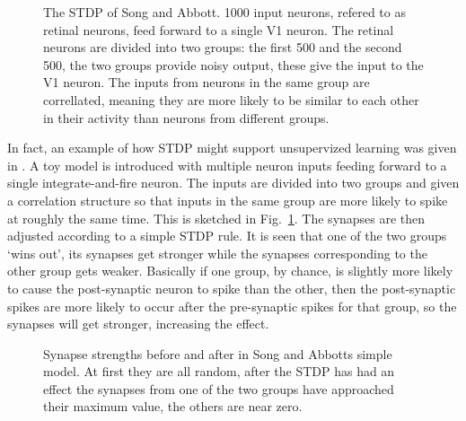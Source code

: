 \documentclass[11pt,a4paper]{scrartcl}
\begin{document}
\begin{figure}
\begin{center}
\end{center}
\caption{The STDP of Song and Abbott. 1000 input neurons, refered to
  as retinal neurons, feed forward to a single V1 neuron. The retinal
  neurons are divided into two groups: the first 500 and the second
  500, the two groups provide noisy output, these give the input to
  the V1 neuron. The inputs from neurons in the same group are
  correllated, meaning they are more likely to be similar to each other in their activity than neurons from different groups.\label{fig:sa_stdp}}
\end{figure}

In fact, an example of how STDP might support unsupervized learning
was given in \cite{SongEtAl2000a,SongAbbott2001a}. A toy model is
introduced with multiple neuron inputs feeding forward to a single
integrate-and-fire neuron. The inputs are divided into two groups and
given a correlation structure so that inputs in the same group are
more likely to spike at roughly the same time. This is sketched in
Fig.~\ref{fig:sa_stdp}. The synapses are then adjusted according to a
simple STDP rule. It is seen that one of the two groups \lq{}wins
out\rq{}, its synapses get stronger while the synapses corresponding
to the other group gets weaker. Basically if one group, by chance, is
slightly more likely to cause the post-synaptic neuron to spike than
the other, then the post-synaptic spikes are more likely to occur
after the pre-synaptic spikes for that group, so the synapses will get
stronger, increasing the effect.


\begin{figure}

\caption{Synapse strengths before and after in Song and Abbotts simple model. At first they are all random, after the STDP has had an effect the synapses from one of the two groups have approached their maximum value, the others are near zero. \label{fig:before_after}}
\end{figure}
\end{document}

